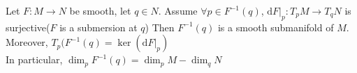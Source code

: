 \begin{theorem}
    Let  $ F:M\rightarrow N $ be smooth, let  $ q\in N $.  Assume  $ \forall p\in F^{-1}(q) $,  $ \mathrm{d}F|_p:T_pM\rightarrow T_qN $ is surjective($ F  $ is a submersion at  $ q $) Then  $ F^{-1}(q)  $ is a smooth submanifold of  $ M  $.\\
    Moreover,  $ T_p(F^{-1}(q)=\ker(\mathrm{d}F|_p) $\\
    In particular,  $ \dim_p F^{-1}(q)=\dim_pM-\dim_qN $  
\end{theorem}
